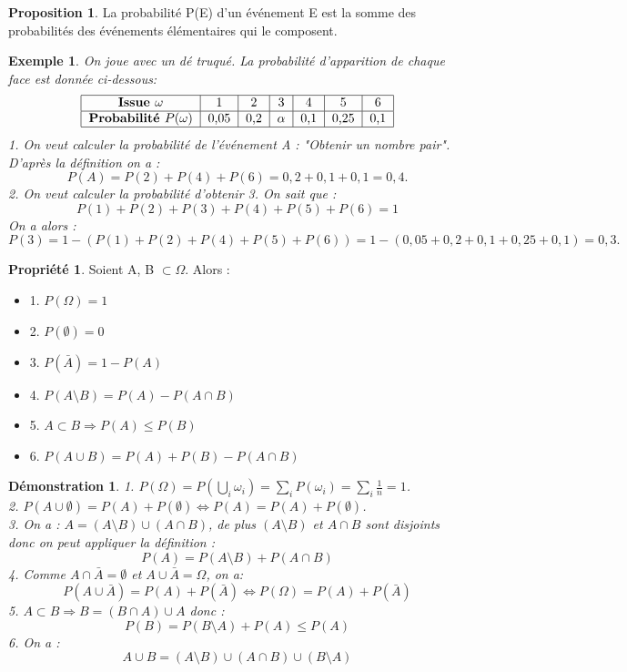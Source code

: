 \documentclass[a4paper,12pt,final]{article}
\newtheorem{Ex}{Exemple}[section]
\newtheorem{Proof}{Démonstration}[section]
\theoremstyle{theorem}
\theoremstyle{definition}
\newtheorem{Propriete}{Propriété}[section]
\theoremstyle{definition}
\newtheorem{Propos}{Proposition}[section]
\theoremstyle{definition}
\begin{document}
		\begin{Propos}
			La probabilité P(E) d'un événement E est la somme des probabilités des événements élémentaires qui le composent.
		\end{Propos}
	
		\begin{Ex}
			On joue avec un dé truqué. La probabilité d'apparition de chaque face est donnée ci-dessous: \[
			\begin{tabular}{|c|c|c|c|c|c|c|}
				\hline \textbf{Issue $\omega$} & 1 & 2 & 3 & 4 & 5 & 6 \\
				\hline \textbf{Probabilité $P(\omega)$} & 0,05 & 0,2 & $\alpha$ & 0,1 & 0,25 & 0,1 \\
				\hline
			\end{tabular} \]
			1. On veut calculer la probabilité de l'événement A : "Obtenir un nombre pair". D'après la définition on a :
			\[P(A) = P(2)+P(4)+P(6) = 0,2+0,1+0,1 = 0,4.\]
			2. On veut calculer la probabilité d'obtenir 3. On sait que :
			\[P(1)+P(2)+P(3)+P(4)+P(5)+P(6) = 1\]
			On a alors : 
			\[P(3) = 1 - (P(1)+P(2)+P(4)+P(5)+P(6)) = 1-(0,05+0,2+0,1+0,25+0,1) = 0,3.\]
		\end{Ex}
	
		\begin{Propriete}
			Soient A, B $\subset \Omega$. Alors :
			\begin{itemize}
				\item 1. $P(\Omega) = 1$
				\item 2. $P(\emptyset) = 0$
				\item 3. $P(\bar{A}) = 1-P(A)$
				\item 4. $P(A\setminus B) = P(A)-P(A\cap B)$
				\item 5. $A\subset B \Rightarrow P(A) \leq P(B)$
				\item 6. $P(A\cup B) = P(A)+P(B)-P(A\cap B)$
			\end{itemize}
		\end{Propriete}
	
		\begin{Proof}
			1. $P(\Omega) = P(\bigcup_{i} \omega_{i}) = \sum_{i} P(\omega_{i}) = \sum_{i}\frac{1}{n} = 1$. \\
			2. $P(A\cup \emptyset) = P(A) + P(\emptyset) \iff P(A) = P(A) + P(\emptyset)$. \\
			3. On a : $A = (A\setminus B)\cup (A\cap B)$, de plus $(A\setminus B)$ et $A\cap B$ sont disjoints donc on peut appliquer la définition : 
			\[P(A) = P(A\setminus B) + P(A\cap B)\]
			4. Comme $A\cap \bar{A} = \emptyset$ et $A\cup \bar{A} = \Omega$, on a:
			\[P(A\cup \bar{A}) = P(A) + P(\bar{A}) \iff P(\Omega) = P(A) + P(\bar{A})\]
			5. $A\subset B \Rightarrow B = (B\cap A)\cup A$ donc :
			\[P(B) = P(B\setminus A) + P(A) \leq P(A) \]
			6. On a :
			\[A\cup B = (A\setminus B)\cup (A\cap B)\cup (B\setminus A)\] 
		\end{Proof}
	
\end{document}
